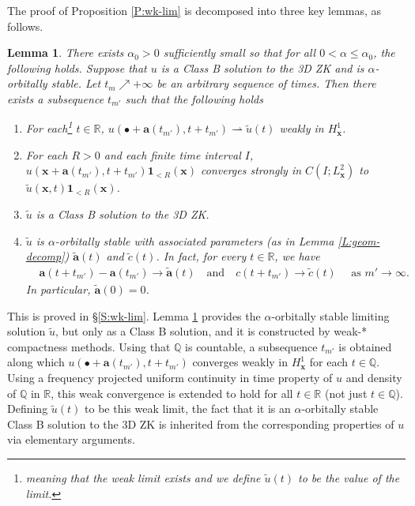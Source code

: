 \documentclass[12pt,letterpaper]{amsart}
\newtheorem{lemma}[theorem]{Lemma}
\theoremstyle{remark}
\numberwithin{equation}{section}
\numberwithin{theorem}{section}
\numberwithin{table}{section}
\begin{document}
The proof of Proposition \ref{P:wk-lim} is decomposed into three key lemmas, as follows.

\begin{lemma}
\label{L:soft-step}
There exists $\alpha_0>0$ sufficiently small so that for all $0<\alpha \leq \alpha_0$, the following holds.  Suppose that $u$ is a Class B solution to the 3D ZK and is $\alpha$-orbitally stable.  Let $t_m \nearrow +\infty$ be an arbitrary sequence of times.  Then there exists a subsequence $t_{m'}$ such that the following holds
\begin{enumerate}
\item 
For each\footnote{meaning that the weak limit exists and we \emph{define} $\tilde u(t)$ to be the value of the limit.} $t\in \mathbb{R}$, $u(\bullet+\mathbf{a}(t_{m'}), t+t_{m'}) \rightharpoonup \tilde u(t)$ weakly in $H_{\mathbf{x}}^1$.
\item For each $R>0$ and each finite time interval $I$, $u(\mathbf{x}+\mathbf{a}(t_{m'}), t+t_{m'}) \mathbf{1}_{<R}(\mathbf{x})$ converges strongly in $C(I; L_{\mathbf{x}}^2)$ to $\tilde u(\mathbf{x},t) \mathbf{1}_{<R}(\mathbf{x})$.
\item $\tilde u$ is a Class B solution to the 3D ZK. 
\item $\tilde u$ is $\alpha$-orbitally stable with associated parameters (as in Lemma \ref{L:geom-decomp}) $\tilde{\mathbf{a}}(t)$ and $\tilde c(t)$.  In fact, for every $t\in \mathbb{R}$, we have 
\begin{equation}
\label{E:param-conv}
\begin{aligned}
&\mathbf{a}(t+t_{m'}) - \mathbf{a}(t_{m'}) \to \tilde{\mathbf{a}}(t)\quad \mbox{and} \quad c(t+t_{m'}) \to \tilde c(t)\quad \text{ as }m'\to \infty. %
\end{aligned}
\end{equation}
In particular, $\tilde{\mathbf{a}}(0)=0$.
\end{enumerate}
\end{lemma}

This is proved in \S \ref{S:wk-lim}.  Lemma \ref{L:soft-step} provides the $\alpha$-orbitally stable limiting solution $\tilde u$, but only as a Class B solution, and it is constructed by weak-* compactness methods.    Using that $\mathbb{Q}$ is countable, a subsequence $t_{m'}$ is obtained along which $u(\bullet+\mathbf{a}(t_{m'}), t+t_{m'})$ converges weakly in $H_{\mathbf{x}}^1$ for each $t\in \mathbb{Q}$.    Using a frequency projected uniform continuity in time property of $u$ and density of $\mathbb{Q}$ in $\mathbb{R}$, this weak convergence is extended to hold for all $t\in \mathbb{R}$ (not just $t\in \mathbb{Q}$).  Defining $\tilde u(t)$ to be this weak limit, the fact that it is an $\alpha$-orbitally stable Class B solution to the 3D ZK is inherited from the corresponding properties of $u$ via elementary arguments. 
\end{document}
